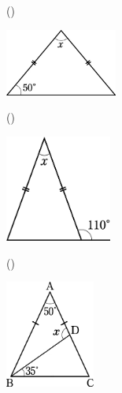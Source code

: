 \documentclass[
  12pt,a4paper,lualatex,ja=standard]{bxjsarticle}
\begin{document}
\begin{flushleft}
\begin{multicols}{2}
\begin{center}
\end{center}

\columnbreak

()\hspace{2.5pt}

\begin{center}
\def\@captype{figure}
\includegraphics[height=22mm]{media/tu2.jpg}

\end{center}

\end{multicols}

\vspace{5mm}

\begin{multicols}{2}
()\hspace{2.5pt}

\begin{center}
\def\@captype{figure}
\includegraphics[height=35mm]{media/tu3.jpg}

\end{center}

\columnbreak

()\hspace{2.5pt}

\begin{center}
\def\@captype{figure}
\includegraphics[height=35mm]{media/tu6.jpg}

\end{center}


\end{multicols}
\end{flushleft}
\end{document}

